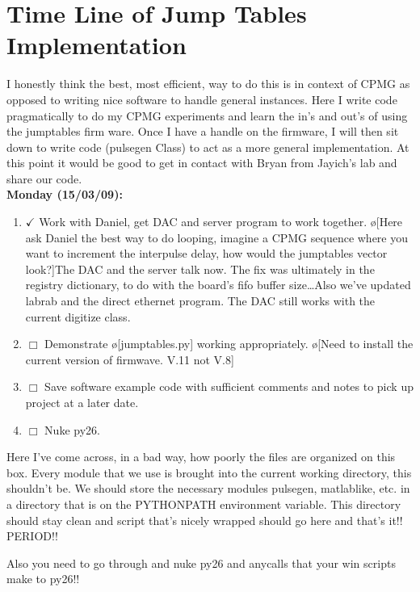 \documentclass[10pt]{book}
\begin{document}
{\section{Time Line of Jump Tables Implementation}

I honestly think the best, most efficient, way to do this is in context of CPMG as opposed to writing nice software to handle general instances. Here I write code pragmatically to do my CPMG experiments and learn the in's and out's of using the jumptables firm ware. Once I have a handle on the firmware, I will then sit down to write code (pulsegen Class) to act as a more general implementation. At this point it would be good to get in contact with Bryan from Jayich's lab and share our code. \\

{\bf Monday (15/03/09):}
\begin{enumerate}
    \item $\checkmark$ Work with Daniel, get DAC and server program to work together. \o[Here ask Daniel the best way to do looping, imagine a CPMG sequence where you want to increment the interpulse delay, how would the jumptables vector look?]{The DAC and the server talk now. The fix was ultimately in the registry dictionary, to do with the board's fifo buffer size\ldots Also we've updated labrab and the direct ethernet program. The DAC still works with the current digitize class.} 
    \item $\Box$ Demonstrate \o[jumptables.py]{} working appropriately. \o[Need to install the current version of firmwave. V.11 not V.8]{}
    \item $\Box$ Save software example code with sufficient comments and notes to pick up project at a later date. \\
    \item $\Box$ Nuke py26.
\end{enumerate} 
Here I've come across, in a bad way, how poorly the files are organized on this box. Every module that we use is brought into the current working directory, this shouldn't be. We should store the necessary modules pulsegen, matlablike, etc. in a directory that is on the PYTHONPATH environment variable. This directory should stay clean and script that's nicely wrapped should go here and that's it!! PERIOD!!

Also you need to go through and nuke py26 and anycalls that your win scripts make to py26!! \\ \\

}
\end{document}
